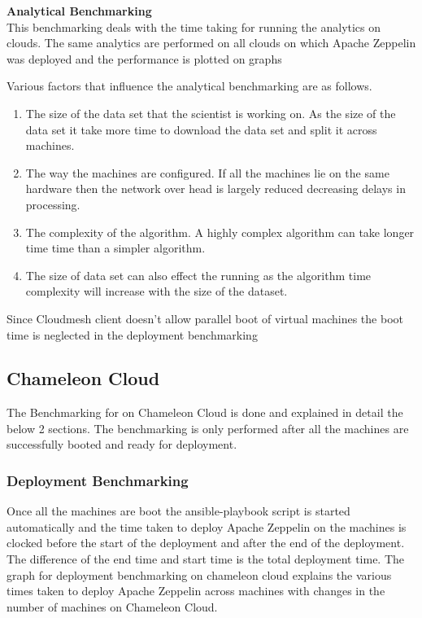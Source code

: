\documentclass[9pt,twocolumn,twoside]{../../styles/osajnl}
\begin{document}
	{\bf\hspace{-3ex} Analytical Benchmarking}
	\\
	This benchmarking deals with the time taking for running the 
	analytics on clouds. The same analytics are performed on all  
	clouds on which Apache Zeppelin was deployed and the performance 
	is 
	plotted on graphs
	
	Various factors that influence the analytical benchmarking are as 
	follows.
	\begin{enumerate}
		\item The size of the data set that the scientist is working 
		on. 
		As the size of the data set it take more time to download the 
		data set and split it across machines.
		\item The way the machines are configured. If all the 
		machines 
		lie on the same hardware then the network over head is 
		largely 
		reduced decreasing delays in processing.
		\item The complexity of the algorithm. A highly complex 
		algorithm 
		can take longer time time than a simpler algorithm.
		\item The size of data set can also effect the running as the 
		algorithm time complexity will increase with the size of the 
		dataset.
	\end{enumerate}
	
	Since Cloudmesh client doesn't allow parallel boot of virtual 
	machines the boot time is neglected in the deployment benchmarking
	
	\subsection{Chameleon Cloud}
	
	The Benchmarking for on Chameleon Cloud is done and explained in 
	detail the below 2 sections. The benchmarking is only performed 
	after 
	all the machines are successfully booted and ready for deployment.
	
	\subsubsection{Deployment Benchmarking}
	
	Once all the machines are boot the ansible-playbook script is 
	started 
	automatically and the time taken to deploy Apache Zeppelin on the 
	machines is clocked before the start of the deployment and after 
	the 
	end of the deployment. The difference of the end time and start 
	time 
	is the total deployment time. The graph for deployment 
	benchmarking 
	on chameleon cloud explains the various 
	times taken to deploy Apache Zeppelin across machines with 
	changes in 
	the number of machines on Chameleon Cloud.
	
\end{document}
